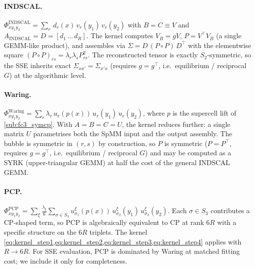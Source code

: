\paragraph{INDSCAL.}
$\Phi_{xy_1y_2}^{\mathrm{INDSCAL}} = \sum_{r}\,d_r(x)\,v_r(y_1)\,v_r(y_2)$
with $B=C\equiv V$ and $A_\mathrm{INDSCAL} = D = [d_1\,\dots\,d_R]$.
The kernel computes $V_B = gV$, $P=V^{\!\top}V_B$ (a single GEMM-like
product), and assembles via $\Sigma = D\,(P\circ P)\,D^{\!\top}$ with
the elementwise square $(P\circ P)_{rs}=\lambda_r\lambda_s P_{rs}^{2}$.
The reconstructed tensor is exactly $S_2$-symmetric, so the SSE
inherits exact $\Sigma_{xx'}=\Sigma_{x'x}$ (requires $g=g^{\!\top}$,
i.e.\ equilibrium / reciprocal $G$) at the algorithmic level.

\paragraph{Waring.}
$\Phi_{xy_1y_2}^{\mathrm{Waring}} = \sum_{r}\lambda_r\,u_r(p(x))\,u_r(y_1)\,u_r(y_2)$,
where $p$ is the supercell lift of \cref{sub:fc3_symcp}. With
$A=B=C=U$, the kernel reduces further: a single matrix $U$
parametrises both the SpMM input and the output assembly. The bubble
is symmetric in $(r,s)$ by construction, so $P$ is symmetric
($P=P^{\!\top}$, requires $g=g^{\!\top}$, i.e.\ equilibrium / reciprocal $G$)
and may be computed as a SYRK (upper-triangular GEMM)
at half the cost of the general INDSCAL GEMM.

\paragraph{PCP.}
$\Phi^{\mathrm{PCP}}_{xy_1y_2} = \sum_{\xi}\tfrac{\lambda_\xi}{6}
\sum_{\sigma\in S_3}
u^{\xi}_{\sigma_1}(p(x))\,u^{\xi}_{\sigma_2}(y_1)\,u^{\xi}_{\sigma_3}(y_2)$.
Each $\sigma\in S_3$ contributes a CP-shaped term, so PCP is
algebraically equivalent to CP at rank $6R$ with a specific structure
on the $6R$ triplets. The kernel
\cref{eq:kernel_step1,eq:kernel_step2,eq:kernel_step3,eq:kernel_step4}
applies with $R \to 6R$. For SSE evaluation, PCP is dominated by
Waring at matched fitting cost; we include it only for completeness.

